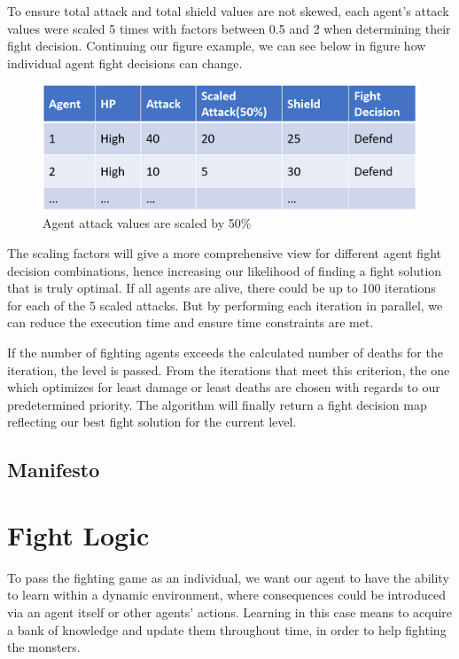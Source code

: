 To ensure total attack and total shield values are not skewed, each agent's attack values were scaled 5 times with factors between 0.5 and 2 when determining their fight decision. Continuing our figure example, we can see below in figure how individual agent fight decisions can change.
\begin{figure}[htb]
    \centering
    \includegraphics[width=1\textwidth]{008_team_5_agent_design/images/scaled-attack.PNG}
    \caption{Agent attack values are scaled by 50\%}
    \label{scaledattack}
\end{figure}

The scaling factors will give a more comprehensive view for different agent fight decision combinations, hence increasing our likelihood of finding a fight solution that is truly optimal. If all agents are alive, there could be up to 100 iterations for each of the 5 scaled attacks. But by performing each iteration in parallel, we can reduce the execution time and ensure time constraints are met.

If the number of fighting agents exceeds the calculated number of deaths for the iteration, the level is passed. From the iterations that meet this criterion, the one which optimizes for least damage or least deaths are chosen with regards to our predetermined priority. The algorithm will finally return a fight decision map reflecting our best fight solution for the current level.


\subsection{Manifesto}



\section{Fight Logic}
To pass the fighting game as an individual, we want our agent to have the ability to learn within a dynamic environment, where consequences could be introduced via an agent itself or other agents' actions. Learning in this case means to acquire a bank of knowledge and update them throughout time, in order to help fighting the monsters.

